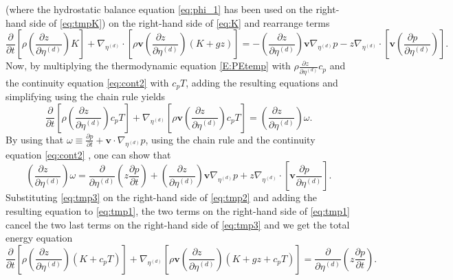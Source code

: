 \documentclass{agujournal}
\begin{document}
{(where the hydrostatic balance equation \eqref{eq:phi_1} has been used on the right-hand side of \eqref{eq:tmpK}) on the right-hand side of \eqref{eq:K} and rearrange terms
\begin{equation}
\frac{\partial }{\partial t}\left[ \rho \left( \frac{\partial z\quad }{\partial \eta^{(d)}}\right)K\right]+\nabla_{\eta^{(d)}} \cdot \left[ \rho \mathbf{v} \left( \frac{\partial z\quad }{\partial \eta^{(d)}}\right) \left( K+gz \right) \right]=-\left( \frac{\partial z}{\partial \eta^{(d)}}\right)\mathbf{v} \nabla_{\eta^{(d)}}p - z \nabla_{\eta^{(d)}}\cdot \left[ \mathbf{v} \left( \frac{\partial p\quad }{\partial \eta^{(d)}}\right)\right].\label{eq:tmp1}
\end{equation}
Now, by multiplying the thermodynamic equation \eqref{E:PEtemp} with $\rho \frac{\partial z\quad }{\partial \eta^{(d)}}c_p$ and the continuity equation \eqref{eq:cont2} with $c_p T$, adding the resulting equations and simplifying using the chain rule yields
\begin{equation}
\frac{\partial }{\partial t}\left[ \rho \left( \frac{\partial z\quad }{\partial \eta^{(d)}}\right)c_p T\right]+\nabla_{\eta^{(d)}} \left[ \rho \mathbf{v} \left( \frac{\partial z\quad }{\partial \eta^{(d)}}\right)c_p T\right]=\left( \frac{\partial z\quad}{\partial \eta^{(d)}}\right)\omega.\label{eq:tmp2}
\end{equation}
By using that $\omega\equiv \frac{\partial p}{\partial t}+\mathbf{v} \cdot \nabla_{\eta^{(d)}} p$, using the chain rule and the continuity equation \eqref{eq:cont2} , one can show that
\begin{equation}
\left( \frac{\partial z\quad}{\partial \eta^{(d)}}\right)\omega = \frac{\partial}{\partial \eta^{(d)}}\left( z\frac{\partial p}{\partial t}\right)+\left( \frac{\partial z}{\partial \eta^{(d)}}\right)\mathbf{v} \nabla_{\eta^{(d)}}p +z \nabla_{\eta^{(d)}}\cdot \left[ \mathbf{v} \frac{\partial p\quad }{\partial \eta^{(d)}}\right].\label{eq:tmp3}
\end{equation}
Substituting \eqref{eq:tmp3} on the right-hand side of \eqref{eq:tmp2} and adding the resulting equation to \eqref{eq:tmp1}, the two terms on the right-hand side of \eqref{eq:tmp1} cancel the two last terms on the right-hand side of \eqref{eq:tmp3} and we get the total energy equation
\begin{equation}
\frac{\partial }{\partial t}\left[ \rho \left( \frac{\partial z\quad }{\partial \eta^{(d)}}\right)\left(K+c_pT\right)\right]+\nabla_{\eta^{(d)}} \left[ \rho \mathbf{v} \left( \frac{\partial z\quad }{\partial \eta^{(d)}}\right) \left( K+gz+c_pT \right) \right]=\frac{\partial}{\partial \eta^{(d)}}\left( z\frac{\partial p}{\partial t}\right).\label{eq:Etotp}

\end{equation}}
\end{document}
